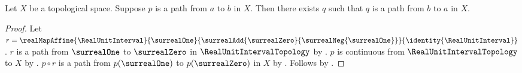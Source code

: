 \begin{theorem}\label{path_can_be_reversed}
    Let $X$ be a topological space.
    Suppose $p$ is a path from $a$ to $b$ in $X$.
    Then there exists $q$ such that $q$ is a path from $b$ to $a$ in $X$.
\end{theorem}
\begin{proof}
    Let $r=\realMapAffine{\RealUnitInterval}{\surrealOne}
        {\surrealAdd{\surrealZero}{\surrealNeg{\surrealOne}}}{\identity{\RealUnitInterval}}$.
    $r$ is a path from $\surrealOne$ to $\surrealZero$ in $\RealUnitIntervalTopology$ by
        .
    $p$ is continuous from $\RealUnitIntervalTopology$ to $X$ by .
    $p\circ r$ is a path from $p(\surrealOne)$ to $p(\surrealZero)$ in $X$ by
        .
    Follows by .
\end{proof}
